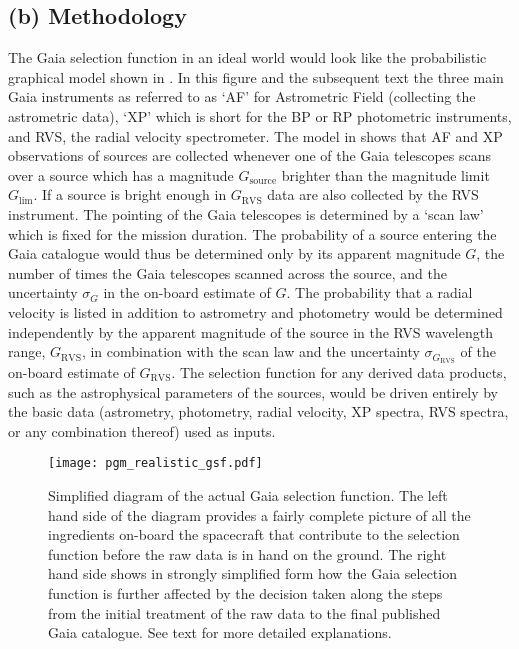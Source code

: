\subsection{(b) Methodology}
\label{sec:methods}

The Gaia selection function in an ideal world would look like the probabilistic graphical model shown in . In this figure and the subsequent text the three main Gaia instruments as referred to as `AF' for Astrometric Field (collecting the astrometric data), `XP' which is short for the BP or RP photometric instruments, and RVS, the radial velocity spectrometer. The model in  shows that AF and XP observations of sources are collected whenever one of the Gaia telescopes scans over a source which has a magnitude $G_\mathrm{source}$ brighter than the magnitude limit $G_\mathrm{lim}$. If a source is bright enough in $G_\mathrm{RVS}$ data are also collected by the RVS instrument. The pointing of the Gaia telescopes is determined by a `scan law' which is fixed for the mission duration. The probability of a source entering the Gaia catalogue would thus be determined only by its apparent magnitude $G$, the number of times the Gaia telescopes scanned across the source, and the uncertainty $\sigma_G$ in the on-board estimate of $G$. The probability that a radial velocity is listed in addition to astrometry and photometry would be determined independently by the apparent magnitude of the source in the RVS wavelength range, $G_\mathrm{RVS}$, in combination with the scan law and the uncertainty $\sigma_{G_\mathrm{RVS}}$ of the on-board estimate of $G_\mathrm{RVS}$. The selection function for any derived data products, such as the astrophysical parameters of the sources, would be driven entirely by the basic data (astrometry, photometry, radial velocity, XP spectra, RVS spectra, or any combination thereof) used as inputs.

\begin{figure}[t]
    \centering
    \texttt{[image: pgm\_realistic\_gsf.pdf]}
    \caption{Simplified diagram of the actual Gaia selection function. The left hand side of the diagram provides a fairly complete picture of all the ingredients on-board the spacecraft that contribute to the selection function before the raw data is in hand on the ground. The right hand side shows in strongly simplified form how the Gaia selection function is further affected by the decision taken along the steps from the initial treatment of the raw data to the final published Gaia catalogue. See text for more detailed explanations.}
    \label{fig:gsf_realistic}
\end{figure}

